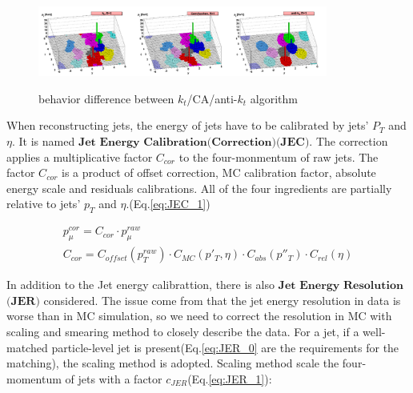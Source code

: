 		\begin{figure}[H]
		\centering{}
	    	\includegraphics[width=0.85\textwidth]{Figures/PhysObj/3type_jetreco.pdf}\\
		\caption{behavior difference between $k_t$/CA/anti-$k_t$ algorithm \cite{Atkin_2015}}
		\label{PhysObj:fig:3type_jetreco}
		\end{figure}
		\FloatBarrier

		When reconstructing jets, the energy of jets have to be calibrated by jets' $P_T$ and $\eta$. It is named $\textbf{Jet}$ $\textbf{Energy}$ $\textbf{Calibration}$$\textbf{(Correction)}$$\textbf{(JEC)}$\cite{collaboration_2011_JEC}. The correction applies a multiplicative factor $C_{cor}$ to the four-monmentum of raw jets. The factor $C_{cor}$ is a product of offset correction, MC calibration factor, absolute energy scale and residuals calibrations. All of the four ingredients are partially relative to jets' $p_T$ and $\eta$.(Eq.\ref{eq:JEC_1})

		\begin{equation}
		\begin{split}
		p_{\mu}^{cor} = C_{cor} \cdot p_{\mu}^{raw} \; \; \; \; \; \; \; \; \; \; \; \; \; \; \; \; \; \; \; \; \; \; \; \; \; \; \; \; \; \; \; \; \; \; \; \; \; \; \; \; \; \; \; \; \; \; \; \; \\
		C_{cor} = C_{offset}(p_T^{raw}) \cdot C_{MC}(p'_T,\eta) \cdot C_{abs}(p''_T) \cdot C_{rel}(\eta)
		\end{split}
		\label{eq:JEC_1}
		\end{equation}
		\FloatBarrier

		In addition to the Jet energy calibrattion, there is also $\textbf{Jet}$ $\textbf{Energy}$ $\textbf{Resolution}$$\textbf{(JER)}$ considered\cite{JER_twiki}. The issue come from that the jet energy resolution in data is worse than in MC simulation, so we need to correct the resolution in MC with scaling and smearing method to closely describe the data. For a jet, if a well-matched particle-level jet is present(Eq.\ref{eq:JER_0} are the requirements for the matching), the scaling method is adopted. Scaling method scale the four-momentum of jets with a factor $c_{JER}$(Eq.\ref{eq:JER_1}):

